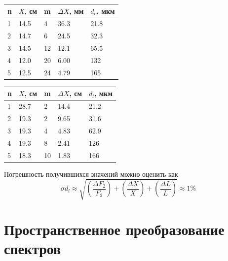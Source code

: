 \documentclass[a4paper,12pt]{article}
\begin{document}
\begin{minipage}{0.5\textwidth}
    \begin{center}
    \begin{tabular}{|l|l|l|l|l|}
    \hline
    n & $X$, см & m  & $\Delta X$, мм & $d_c$, мкм \\ \hline
    1 & 14.5    & 4  & 36.3           & 21.8       \\ 
    2 & 14.7    & 6  & 24.5           & 32.3       \\ 
    3 & 14.5    & 12 & 12.1           & 65.5       \\ 
    4 & 12.0    & 20 & 6.00           & 132        \\ 
    5 & 12.5    & 24 & 4.79           & 165        \\ \hline
    \end{tabular}
    \label{table::no_lenses}
    \end{center}
\end{minipage}
\begin{minipage}{0.5\textwidth}
    \begin{center}
    \begin{tabular}{|l|l|l|l|l|}
    \hline
    n & $X$, см & m  & $\Delta X$, см & $d_l$, мкм \\ \hline
    1 & 28.7    & 2  & 14.4           & 21.2       \\
    2 & 19.3    & 2  & 9.65           & 31.6       \\
    3 & 19.3    & 4  & 4.83           & 62.9       \\
    4 & 19.3    & 8  & 2.41           & 126        \\
    5 & 18.3    & 10 & 1.83           & 166        \\ \hline
    \end{tabular}
    \label{table::with_lenses}
    \end{center}
\end{minipage}
$$$$
Погрешность получившихся значений можно оценить как 
$$\sigma d_l \approx \sqrt{\left(\frac{\Delta F_2}{F_2}\right) + \left(\frac{\Delta X}{X}\right) + \left(\frac{\Delta L}{L}\right)} \approx 1\%$$

\section*{Пространственное преобразование спектров}
\end{document}
